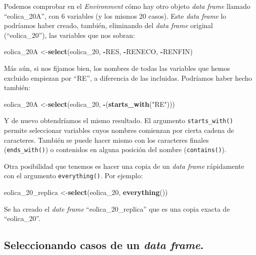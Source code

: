 \documentclass[
]{book}
\newenvironment{Shaded}{\begin{snugshade}}{\end{snugshade}}
\newcommand{\FunctionTok}[1]{\textcolor[rgb]{0.13,0.29,0.53}{\textbf{#1}}}
\newcommand{\NormalTok}[1]{#1}
\newcommand{\OtherTok}[1]{\textcolor[rgb]{0.56,0.35,0.01}{#1}}
\newcommand{\SpecialCharTok}[1]{\textcolor[rgb]{0.81,0.36,0.00}{\textbf{#1}}}
\newcommand{\StringTok}[1]{\textcolor[rgb]{0.31,0.60,0.02}{#1}}
\begin{document}
Podemos comprobar en el \emph{Environment} cómo hay otro objeto \emph{data frame} llamado ``eolica\_20A'', con 6 variables (y los mismos 20 casos). Este \emph{data frame} lo podríamos haber creado, también, eliminando del \emph{data frame} original (``eolica\_20''), las variables que nos sobran:

\begin{Shaded}
\begin{Highlighting}[]
\NormalTok{eolica\_20A }\OtherTok{\textless{}{-}}\FunctionTok{select}\NormalTok{(eolica\_20, }\SpecialCharTok{{-}}\NormalTok{RES, }\SpecialCharTok{{-}}\NormalTok{RENECO, }\SpecialCharTok{{-}}\NormalTok{RENFIN)}
\end{Highlighting}
\end{Shaded}

Más aún, si nos fijamos bien, los nombres de todas las variables que hemos excluido empiezan por ``RE'', a diferencia de las incluidas. Podríamos haber hecho también:

\begin{Shaded}
\begin{Highlighting}[]
\NormalTok{eolica\_20A }\OtherTok{\textless{}{-}}\FunctionTok{select}\NormalTok{(eolica\_20, }\SpecialCharTok{{-}}\NormalTok{(}\FunctionTok{starts\_with}\NormalTok{(}\StringTok{"RE"}\NormalTok{)))}
\end{Highlighting}
\end{Shaded}

Y de nuevo obtendríamos el mismo resultado. El argumento \texttt{starts\_with()} permite seleccionar variables cuyos nombres comienzan por cierta cadena de caracteres. También se puede hacer mismo con los caracteres finales (\texttt{ends\_with()}) o contenidos en alguna posición del nombre (\texttt{contains()}).

Otra posibilidad que tenemos es hacer una copia de un \emph{data frame} rápidamente con el argumento \texttt{everything()}. Por ejemplo:

\begin{Shaded}
\begin{Highlighting}[]
\NormalTok{eolica\_20\_replica }\OtherTok{\textless{}{-}}\FunctionTok{select}\NormalTok{(eolica\_20, }\FunctionTok{everything}\NormalTok{())}
\end{Highlighting}
\end{Shaded}

Se ha creado el \emph{date frame} ``eolica\_20\_replica'' que es una copia exacta de ``eolica\_20''.

\subsection{\texorpdfstring{Seleccionando casos de un \emph{data frame}.}{Seleccionando casos de un data frame.}}\label{seleccionando-casos-de-un-data-frame.}
\end{document}
